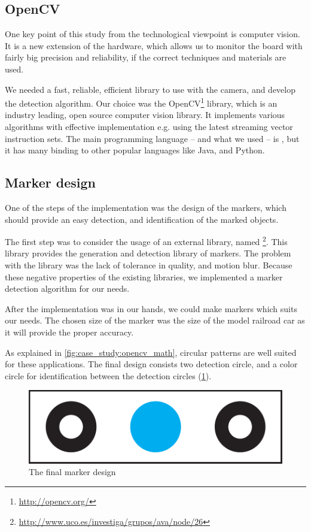 \subsection{OpenCV}

One key point of this study from the technological viewpoint is computer vision. It is a new extension of the hardware, which allows us to monitor the board with fairly big precision and reliability, if the correct techniques and materials are used.

We needed a fast, reliable, efficient library to use with the camera, and develop the detection algorithm. Our choice was the OpenCV\footnote{\url{http://opencv.org/}} library, which is an industry leading, open source computer vision library. It implements various algorithms with effective implementation e.g. using the latest streaming vector instruction sets. The main programming language -- and what we used -- is , but it has many binding to other popular languages like Java, and Python.

\subsection{Marker design}

One of the steps of the  implementation was the design of the markers, which should provide an easy detection, and identification of the marked objects.

The first step was to consider the usage of an external library, named \footnote{\url{http://www.uco.es/investiga/grupos/ava/node/26}}. This library provides the generation and detection library of markers. The problem with the library was the lack of tolerance in quality, and motion blur. Because these negative properties of the existing libraries, we implemented a marker detection algorithm for our needs.

After the implementation was in our hands, we could make markers which suits our needs. The chosen size of the marker was the size of the model railroad car as it will provide the proper accuracy.

As explained in \cref{fig:case_study:opencv_math}, circular patterns are well suited for these applications. The final design consists two detection circle, and a color circle for identification between the detection circles (\cref{fig:case_study:final_marker}).

\begin{figure}[h]
	\centering
	\includegraphics[width=0.5\linewidth]{include/figures/chapter_6/opencv_finalmarker}
	\caption{The final marker design}
	\label{fig:case_study:final_marker} 
\end{figure}

